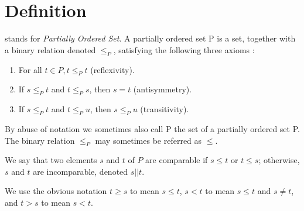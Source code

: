 \section{Definition}

 stands for \emph{Partially Ordered Set}. A partially ordered set P is a set, together with a binary relation denoted $\leq_P$, satisfying the following three axioms \cite{Stanley:2011:ECV:2124415}:

\begin{enumerate}
\item For all $t \in P, t \leq_P t$ (reflexivity).
\item If $s \leq_P t$ and $t \leq_P s$, then $s = t$ (antisymmetry).
\item If $s \leq_P t$ and $t \leq_P u$, then $s \leq_P u$ (transitivity).
\end{enumerate}

By abuse of notation we sometimes also call P the set of a partially ordered set P. The binary relation $\leq_P$ may sometimes be referred as $\leq$.

We say that two elements $s$ and $t$ of $P$ are comparable if $s \leq t$ or $t \leq s$; otherwise, $s$ and $t$ are incomparable, denoted $s || t$.

We use the obvious notation $t \geq s$ to mean $s \leq t$, $s < t$ to mean $s \leq t$ and $s \neq t$, and $t > s$ to mean $s < t$.
